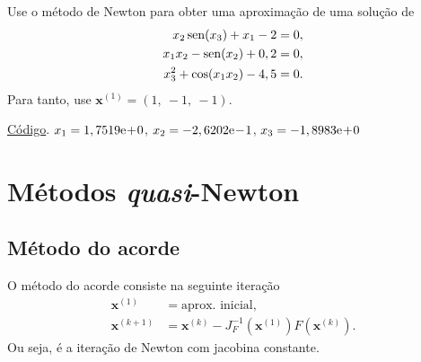\begin{exer}\label{ex:newton_exec}
  Use o método de Newton para obter uma aproximação de uma solução de
  \begin{align}
    x_2\operatorname{sen}(x_3)+x_1-2&=0,\\
    x_1x_2-\operatorname{sen}(x_2)+0,2&=0,\\
    x_3^2+\cos(x_1x_2)-4,5&=0.
  \end{align}
Para tanto, use $\pmb{x}^{(1)} = (1,~-1,~-1)$.
\end{exer}
\begin{resp}
    \ifisoctave 
    \href{https://github.com/phkonzen/notas/blob/master/src/MatematicaNumerica/cap_snl/dados/exer_newton_exec/exer_newton_exec.m}{Código}. 
  \fi
  $x_1 = 1,7519\mathrm{e}\!+\!0$, $x_2 = -2,6202\mathrm{e}\!-\!1$, $x_3 =-1,8983\mathrm{e}\!+\!0$
\end{resp}



\section{Métodos {\it quasi}-Newton}\label{cap_snl_sec_quasi_newton}

\subsection{Método do acorde}

O método do acorde consiste na seguinte iteração
\begin{align}
  \pmb{x}^{(1)} &= \text{aprox. inicial},\\
  \pmb{x}^{(k+1)} &= \pmb{x}^{(k)} - J_F^{-1}(\pmb{x}^{(1)})F(\pmb{x}^{(k)}).
\end{align}
Ou seja, é a iteração de Newton com jacobina constante.

